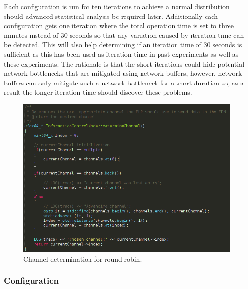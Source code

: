 \documentclass[]{article}
\begin{document}
Each configuration is run for ten iterations to achieve a normal distribution should advanced statistical analysis be required later. Additionally each configuration gets one iteration where the total operation time is set to three minutes instead of 30 seconds so that any variation caused by iteration time can be detected. This will also help determining if an iteration time of 30 seconds is sufficient as this has been used as iteration time in past experiments as well as these experiments. The rationale is that the short iterations could hide potential network bottlenecks that are mitigated using network buffers, however, network buffers can only mitigate such a network bottleneck for a short duration so, as a result the longer iteration time should discover these problems.

\begin{center}
	\begin{figure}[H]
		\includegraphics[width=\textwidth]{images/determine-channel}
		\caption{Channel determination for round robin.}
		\label{fig:ssh}
	\end{figure}
\end{center}

\subsubsection{Configuration}
\end{document}
